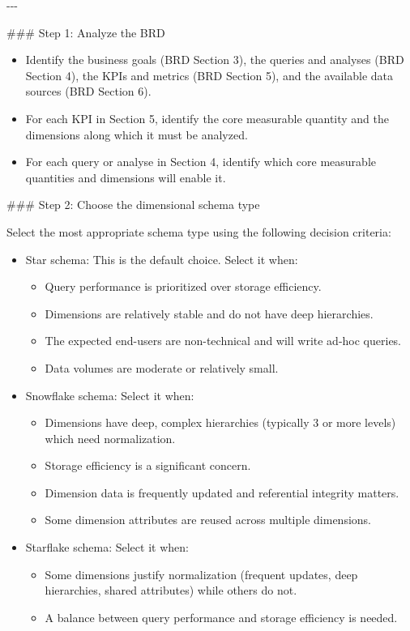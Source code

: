 -{}-{}-
\newline

\#\#\# Step 1: Analyze the BRD
\newline

\begin{itemize}
    \item Identify the business goals (BRD Section 3), the queries and analyses (BRD Section 4), the KPIs and metrics (BRD Section 5), and the available data sources (BRD Section 6).
    \item For each KPI in Section 5, identify the core measurable quantity and the dimensions along which it must be analyzed.
    \item For each query or analyse in Section 4, identify which core measurable quantities and dimensions will enable it.
\end{itemize}

\#\#\# Step 2: Choose the dimensional schema type
\newline

Select the most appropriate schema type using the following decision criteria:
\newline

\begin{itemize}
    \item Star schema: This is the default choice. Select it when:
    \begin{itemize}
        \item Query performance is prioritized over storage efficiency.
        \item Dimensions are relatively stable and do not have deep hierarchies.
        \item The expected end-users are non-technical and will write ad-hoc queries.
        \item Data volumes are moderate or relatively small.
    \end{itemize}
    \item Snowflake schema: Select it when:
    \begin{itemize}
        \item Dimensions have deep, complex hierarchies (typically 3 or more levels) which need normalization.
        \item Storage efficiency is a significant concern.
        \item Dimension data is frequently updated and referential integrity matters.
        \item Some dimension attributes are reused across multiple dimensions.
    \end{itemize}
    \item Starflake schema: Select it when:
    \begin{itemize}
        \item Some dimensions justify normalization (frequent updates, deep hierarchies, shared attributes) while others do not.
        \item A balance between query performance and storage efficiency is needed.
    \end{itemize}
\end{itemize}

